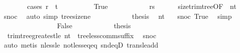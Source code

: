 \begin{isabellebody}
\ \ \ \ \ \ \isamarkupfalse%
\ {\isacharparenleft}{\kern0pt}cases\ {\isachardoublequoteopen}r{\isacharprime}{\kern0pt}\ {\isacharequal}{\kern0pt}\ t{\isacharprime}{\kern0pt}{\isachardoublequoteclose}{\isacharparenright}{\kern0pt}\isanewline
\ \ \ \ \ \ \ \ \isamarkupfalse%
\ True\isanewline
\ \ \ \ \ \ \ \ \isamarkupfalse%
\ \isamarkupfalse%
\ {\isachardoublequoteopen}rs{\isacharprime}{\kern0pt}\ {\isacharequal}{\kern0pt}\ {\isacharbrackleft}{\kern0pt}{\isacharbrackright}{\kern0pt}{\isachardoublequoteclose}\ \isamarkupfalse%
\ {}\ {}{\isacharparenleft}{\kern0pt}{}{\isacharparenright}{\kern0pt}\ size{\isacharunderscore}{\kern0pt}trim{\isacharunderscore}{\kern0pt}tree{\isacharbrackleft}{\kern0pt}OF\ {\isacharunderscore}{\kern0pt}\ nt{\isacharprime}{\kern0pt}{\isacharbrackright}{\kern0pt}\ \isamarkupfalse%
\ snoc\ \isamarkupfalse%
\ {\isacharparenleft}{\kern0pt}auto\ simp{\isacharcolon}{\kern0pt}\ tree{\isacharunderscore}{\kern0pt}size{\isacharunderscore}{\kern0pt}ne{\isacharunderscore}{\kern0pt}{}{\isacharparenright}{\kern0pt}\isanewline
\ \ \ \ \ \ \ \ \isamarkupfalse%
\ \isamarkupfalse%
\ {\isacharquery}{\kern0pt}thesis\ \isamarkupfalse%
\ nt{\isacharprime}{\kern0pt}\ {}\ \isamarkupfalse%
\ snoc\ True\ \isamarkupfalse%
\ simp\isanewline
\ \ \ \ \ \ \isamarkupfalse%
\isanewline
\ \ \ \ \ \ \ \ \isamarkupfalse%
\ False\isanewline
\ \ \ \ \ \ \ \ \isamarkupfalse%
\ \isamarkupfalse%
\ {\isacharquery}{\kern0pt}thesis\ \isamarkupfalse%
\ {}\ trim{\isacharunderscore}{\kern0pt}tree{\isacharunderscore}{\kern0pt}greatest{\isacharunderscore}{\kern0pt}le\ nt{\isacharprime}{\kern0pt}\ {}\ tree{\isacharunderscore}{\kern0pt}less{\isacharunderscore}{\kern0pt}comm{\isacharunderscore}{\kern0pt}suffix{}\ \isamarkupfalse%
\ snoc\isanewline
\ \ \ \ \ \ \ \ \ \ \isamarkupfalse%
\ {\isacharparenleft}{\kern0pt}auto{\isacharcomma}{\kern0pt}\ metis\ nless{\isacharunderscore}{\kern0pt}le\ not{\isacharunderscore}{\kern0pt}less{\isacharunderscore}{\kern0pt}eq{\isacharunderscore}{\kern0pt}eq\ snd{\isacharunderscore}{\kern0pt}eqD\ trans{\isacharunderscore}{\kern0pt}le{\isacharunderscore}{\kern0pt}add{}{\isacharparenright}{\kern0pt}\isanewline
\ \ \ \ \ \ \isamarkupfalse%

\end{isabellebody}
